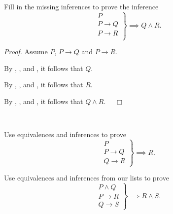 \begin{exer}[\exerP] %
\label{exer_prove_complicated_infer}
    Fill in the missing inferences to prove the inference $$\left. 
        \begin{array} {cc}
        P \\
        P \to Q \\
        P \to R \\ 
        \end{array} \right\} \implies Q \land R.$$

        \emph{Proof.} Assume  $P$,  $P \to Q$ and  $P \to R$. 

        By , , and \underline{\hspace{.75 in}}, it follows that  $Q$.

        By , , and \underline{\hspace{.75 in}}, it follows that  $R$.

        By , , and \underline{\hspace{.75 in}}, it follows that  $Q \land R$.~ \hfill ~$\Box$ 
\end{exer}

\begin{exer}[\exerP] %
\label{exer_proof_doublemp_equiv_infer}
~
    \begin{exerpart}
        \item Use equivalences and inferences to prove $$\left. \begin{array} {c} P \\ P \to Q \\ Q \to R \end{array} \right\} \implies R.$$
        \item Use equivalences and inferences from our lists to prove
            $$\left. \begin{array} {cc} P \land Q \\ P \to R \\ Q \to S\end{array} \right\} \implies R \land S.$$
    \end{exerpart}
\end{exer}

